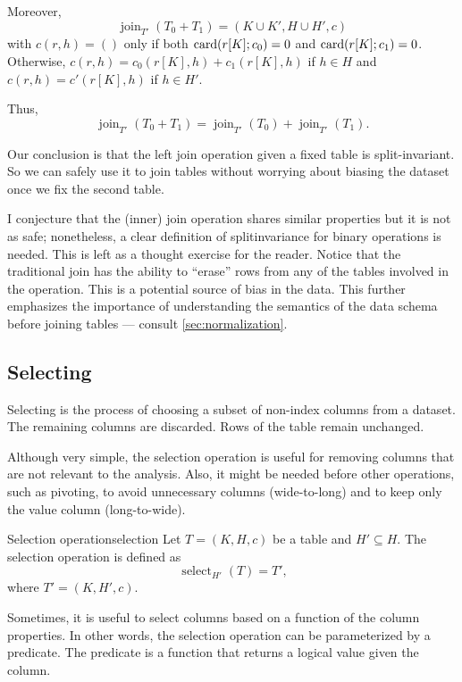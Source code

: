 Moreover, \[
  \operatorname{join}_{T'}(T_0 + T_1) = (K \cup K', H \cup H', c)
\] with $c(r, h) = ()$ only if both $\rowcard[{r[K]; c_0}] = 0$ and $\rowcard[{r[K];
c_1}] = 0$.  Otherwise, $c(r, h) = c_0(r[K], h) + c_1(r[K], h)$ if $h \in H$ and $c(r,
h) = c'(r[K], h)$ if $h \in H'$.

Thus, \[
  \operatorname{join}_{T'}(T_0 + T_1) = \operatorname{join}_{T'}(T_0) + \operatorname{join}_{T'}(T_1)\text{.}
\]

Our conclusion is that the left join operation given a fixed table is split-invariant.
So we can safely use it to join tables without worrying about biasing the dataset once we
fix the second table.

I conjecture that the (inner) join operation shares similar properties but it is not as
safe; nonetheless, a clear definition of \gls{splitinvariance} for binary operations is needed.
This is left as a thought exercise for the reader.  Notice that the traditional join has
the ability to ``erase'' rows from any of the tables involved in the operation.  This is a
potential source of bias in the data.  This further emphasizes the importance of
understanding the semantics of the data schema before joining tables --- consult
\cref{sec:normalization}.

\subsection{Selecting}
\label{sub:selection}

Selecting is the process of choosing a subset of non-index columns from a dataset.  The
remaining columns are discarded.  Rows of the table remain unchanged.

Although very simple, the selection operation is useful for removing columns that are not
relevant to the analysis.  Also, it might be needed before other operations, such as
pivoting, to avoid unnecessary columns (wide-to-long) and to keep only the value column
(long-to-wide).

\begin{defbox}{Selection operation}{selection}
  Let $T = (K, H, c)$ be a table and $H' \subseteq H$.  The selection operation is
  defined as \[
    \operatorname{select}_{H'}(T) = T'\text{,}
  \] where $T' = (K, H', c)$.
\end{defbox}

Sometimes, it is useful to select columns based on a function of the column properties.
In other words, the selection operation can be parameterized by a predicate.  The predicate
is a function that returns a logical value given the column.

